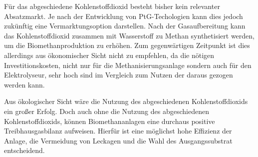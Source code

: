 Für das abgeschiedene Kohlenstoffdioxid besteht bisher kein relevanter Absatzmarkt. Je nach der Entwicklung von \gls{PtG}-Techologien kann dies jedoch zukünftig eine Vermarktungsoption darstellen. Nach der Gasaufbereitung kann das Kohlenstoffdioxid zusammen mit Wasserstoff zu Methan synthetisiert werden, um die Biomethanproduktion zu erhöhen. Zum gegenwärtigen Zeitpunkt ist dies allerdings aus ökonomischer Sicht nicht zu empfehlen, da die nötigen Investitionskosten, nicht nur für die Methanisierungsanlage sondern auch für den Elektrolyseur, sehr hoch sind im Vergleich zum Nutzen der daraus gezogen werden kann.\smallskip

Aus ökologischer Sicht wäre die Nutzung des abgeschiedenen Kohlenstoffdioxids ein großer Erfolg. Doch auch ohne die Nutzung des abgeschiedenen Kohlenstoffdioxids, können Biomethananlagen eine durchaus positive Treibhausgasbilanz aufweisen. Hierfür ist eine möglichst hohe Effizienz der Anlage, die Vermeidung von Leckagen und die Wahl des Ausgangssubstrat entscheidend.